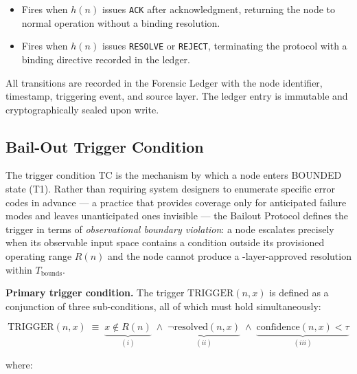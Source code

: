 \begin{itemize}
\item[T8 --- \texttt{HUMAN\_ACKNOWLEDGED $\rightarrow$ IDLE}:] Fires when $h(n)$ issues \texttt{ACK} after acknowledgment, returning the node to normal operation without a binding resolution.

\item[T9 --- \texttt{HUMAN\_ACKNOWLEDGED $\rightarrow$ RESOLVED}:] Fires when $h(n)$ issues \texttt{RESOLVE} or \texttt{REJECT}, terminating the protocol with a binding directive recorded in the ledger.
\end{itemize}

All transitions are recorded in the Forensic Ledger with the node identifier, timestamp, triggering event, and source layer. The ledger entry is immutable and cryptographically sealed upon write.

\subsection{Bail-Out Trigger Condition}\label{sec:bailout-trigger}

The trigger condition TC is the mechanism by which a node enters BOUNDED state (T1). Rather than requiring system designers to enumerate specific error codes in advance — a practice that provides coverage only for anticipated failure modes and leaves unanticipated ones invisible — the Bailout Protocol defines the trigger in terms of \emph{observational boundary violation}: a node escalates precisely when its observable input space contains a condition outside its provisioned operating range $R(n)$ and the node cannot produce a \fact-layer-approved resolution within $T_{\text{bounds}}$.

\bigskip
\noindent\textbf{Primary trigger condition.} The trigger $\text{TRIGGER}(n, x)$ is defined as a conjunction of three sub-conditions, all of which must hold simultaneously:

\begin{equation}
\text{TRIGGER}(n, x) \;\equiv\; \underbrace{x \notin R(n)}_{(i)} \;\land\; \underbrace{\neg\text{resolved}(n, x)}_{(ii)} \;\land\; \underbrace{\text{confidence}(n, x) < \tau}_{(iii)} \tag{TC}
\end{equation}

where:

